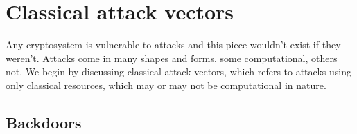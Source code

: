 \section{Classical attack vectors} \label{classical-attack-vectors}

Any cryptosystem is vulnerable to attacks and this piece wouldn't exist if they weren't. Attacks come in many shapes and forms, some computational, others not. We begin by discussing classical attack vectors, which refers to attacks using only classical resources, which may or may not be computational in nature.

\subsection{Backdoors} \label{backdoors}

